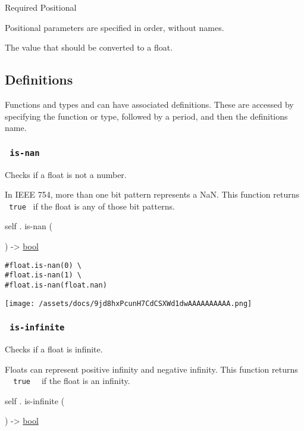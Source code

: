 {Required} {{ Positional }}

\label{constructor-value-positional-tooltip}
Positional parameters are specified in order, without names.

The value that should be converted to a float.

\subsection{\texorpdfstring{{ Definitions
}}{ Definitions }}\label{definitions}

\label{definitions-tooltip}
Functions and types and can have associated definitions. These are
accessed by specifying the function or type, followed by a period, and
then the definition\textquotesingle s name.

\subsubsection{\texorpdfstring{\texttt{\ is-nan\ }}{ is-nan }}\label{definitions-is-nan}

Checks if a float is not a number.

In IEEE 754, more than one bit pattern represents a NaN. This function
returns \texttt{\ true\ } if the float is any of those bit patterns.

self { . } { is-nan } (

) -\textgreater{} \href{/docs/reference/foundations/bool/}{bool}

\begin{verbatim}
#float.is-nan(0) \
#float.is-nan(1) \
#float.is-nan(float.nan)
\end{verbatim}

\texttt{[image: /assets/docs/9jd8hxPcunH7CdCSXWd1dwAAAAAAAAAA.png]}

\subsubsection{\texorpdfstring{\texttt{\ is-infinite\ }}{ is-infinite }}\label{definitions-is-infinite}

Checks if a float is infinite.

Floats can represent positive infinity and negative infinity. This
function returns \texttt{\ }{\texttt{\ true\ }}\texttt{\ } if the float
is an infinity.

self { . } { is-infinite } (

) -\textgreater{} \href{/docs/reference/foundations/bool/}{bool}


